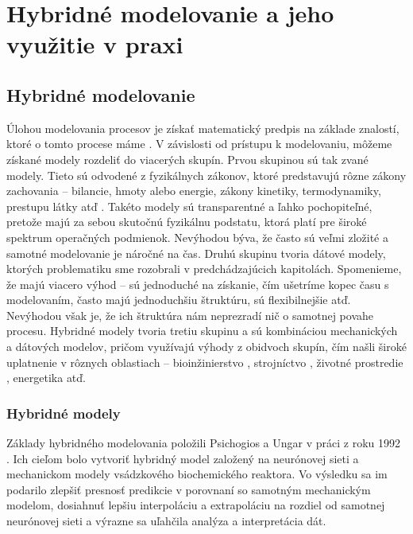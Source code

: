 \part{Hybridné modelovanie a jeho využitie v praxi}
\chapter{Hybridné modelovanie}
Úlohou modelovania procesov je získať matematický predpis na základe znalostí, ktoré o tomto procese máme \cite{hangos:process_modelling:2001}. V závislosti od prístupu k modelovaniu, môžeme získané modely rozdeliť do viacerých skupín. Prvou skupinou sú tak zvané  modely. Tieto sú odvodené z fyzikálnych zákonov, ktoré predstavujú rôzne zákony zachovania -- bilancie, hmoty alebo energie, zákony kinetiky, termodynamiky, prestupu látky atď \cite{bangi:chem_engineer:2020}. Takéto modely sú transparentné a ľahko pochopiteľné, pretože majú za sebou skutočnú fyzikálnu podstatu, ktorá platí pre široké spektrum operačných podmienok. Nevýhodou býva, že často sú veľmi zložité a samotné modelovanie je náročné na čas. Druhú skupinu tvoria dátové modely, ktorých problematiku sme rozobrali v predchádzajúcich kapitolách. Spomenieme, že majú viacero výhod -- sú jednoduché na získanie, čím ušetríme kopec času s modelovaním, často majú jednoduchšiu štruktúru, sú flexibilnejšie atď. Nevýhodou však je, že ich štruktúra nám neprezradí nič o samotnej povahe procesu. Hybridné modely tvoria tretiu skupinu a  sú kombináciou mechanických a dátových modelov, pričom využívajú výhody z obidvoch skupín, čím našli široké uplatnenie v rôznych oblastiach -- bioinžinierstvo \cite{srivastava:hybrid_biomolecules:2020}, strojníctvo \cite{liu:hybrid_vehicle:2020}, životné prostredie \cite{liu:hybrid_waste_water:2019}, energetika \cite{qian:hybrid_energy:2019} atď.

\section{Hybridné modely}
Základy hybridného modelovania položili Psichogios a Ungar v práci  z roku 1992 \cite{psichogios:hybrid_process_model:1992}. Ich cieľom bolo vytvoriť hybridný model založený na neurónovej sieti a mechanickom modely vsádzkového biochemického reaktora. Vo výsledku sa im podarilo zlepšiť presnosť predikcie v porovnaní so samotným mechanickým modelom, dosiahnuť lepšiu interpoláciu a extrapoláciu na rozdiel od samotnej neurónovej sieti a výrazne sa uľahčila analýza a interpretácia dát.

